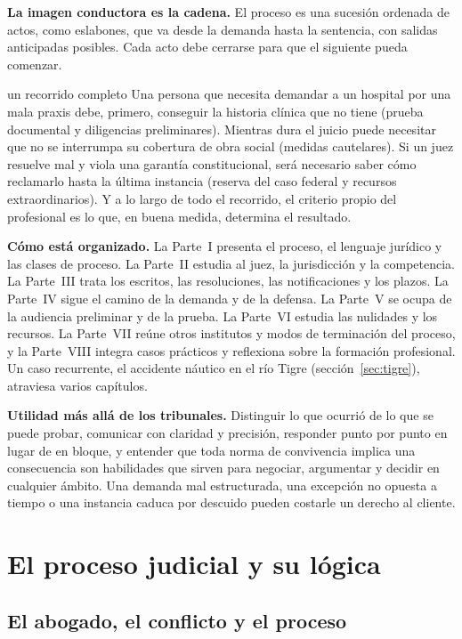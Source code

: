 \documentclass[12pt,oneside]{book}
\begin{document}
\textbf{La imagen conductora es la cadena.} El proceso es una sucesión ordenada de actos, como eslabones, que va desde la demanda hasta la sentencia, con salidas anticipadas posibles. Cada acto debe cerrarse para que el siguiente pueda comenzar.

\begin{ejemplo}{un recorrido completo}
Una persona que necesita demandar a un hospital por una mala praxis debe, primero, conseguir la historia clínica que no tiene (prueba documental y diligencias preliminares). Mientras dura el juicio puede necesitar que no se interrumpa su cobertura de obra social (medidas cautelares). Si un juez resuelve mal y viola una garantía constitucional, será necesario saber cómo reclamarlo hasta la última instancia (reserva del caso federal y recursos extraordinarios). Y a lo largo de todo el recorrido, el criterio propio del profesional es lo que, en buena medida, determina el resultado.
\end{ejemplo}

\textbf{Cómo está organizado.} La Parte~I presenta el proceso, el lenguaje jurídico y las clases de proceso. La Parte~II estudia al juez, la jurisdicción y la competencia. La Parte~III trata los escritos, las resoluciones, las notificaciones y los plazos. La Parte~IV sigue el camino de la demanda y de la defensa. La Parte~V se ocupa de la audiencia preliminar y de la prueba. La Parte~VI estudia las nulidades y los recursos. La Parte~VII reúne otros institutos y modos de terminación del proceso, y la Parte~VIII integra casos prácticos y reflexiona sobre la formación profesional. Un caso recurrente, el accidente náutico en el río Tigre (sección~\ref{sec:tigre}), atraviesa varios capítulos.

\textbf{Utilidad más allá de los tribunales.} Distinguir lo que ocurrió de lo que se puede probar, comunicar con claridad y precisión, responder punto por punto en lugar de en bloque, y entender que toda norma de convivencia implica una consecuencia son habilidades que sirven para negociar, argumentar y decidir en cualquier ámbito. Una demanda mal estructurada, una excepción no opuesta a tiempo o una instancia caduca por descuido pueden costarle un derecho al cliente.

\part{El proceso judicial y su lógica}

\chapter{El abogado, el conflicto y el proceso}
\end{document}

